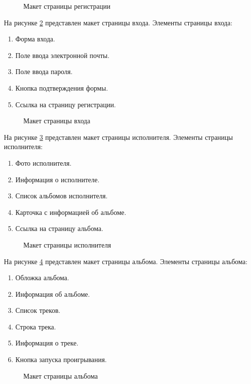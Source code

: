 \begin{figure}[ht]
	\caption{Макет страницы регистрации}
	\label{regMaket:image}
\end{figure}
На рисунке \ref{loginMaket:image} представлен макет страницы входа. Элементы страницы входа:
\begin{enumerate}
	\item Форма входа.
	\item Поле ввода электронной почты.
	\item Поле ввода пароля.
	\item Кнопка подтверждения формы.
	\item Ссылка на страницу регистрации.
\end{enumerate} 
\begin{figure}[H]
	\caption{Макет страницы входа}
	\label{loginMaket:image}
\end{figure}
На рисунке \ref{artistMaket:image} представлен макет страницы исполнителя. Элементы страницы исполнителя:
	\begin{enumerate}
		\item Фото исполнителя.
		\item Информация о исполнителе.
		\item Список альбомов исполнителя.
		\item Карточка с информацией об альбоме.
		\item Ссылка на страницу альбома.
	\end{enumerate} 
\begin{figure}[H]
	\caption{Макет страницы исполнителя}
	\label{artistMaket:image}
\end{figure}
На рисунке \ref{albumMaket:image} представлен макет страницы альбома. Элементы страницы альбома:
\begin{enumerate}
	\item Обложка альбома.
	\item Информация об альбоме.
	\item Список треков.
	\item Строка трека.
	\item Информация о треке.
	\item Кнопка запуска проигрывания.
\end{enumerate} 
\begin{figure}[ht]
	\caption{Макет страницы альбома}
	\label{albumMaket:image}
\end{figure}

